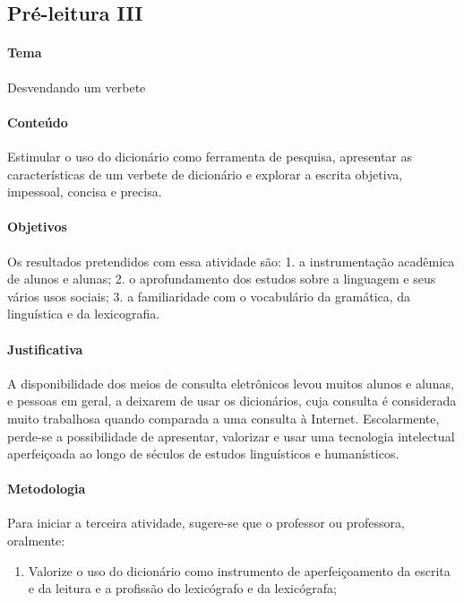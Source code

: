 \documentclass[12pt]{extarticle}
\begin{document}
{\subsection{Pré-leitura III}

\paragraph{Tema} Desvendando um verbete 


\paragraph{Conteúdo} Estimular o uso do dicionário como ferramenta de pesquisa, apresentar as características de um verbete de dicionário e explorar a escrita objetiva, impessoal, concisa e precisa.


\paragraph{Objetivos}
Os resultados pretendidos com essa atividade são: 1. a instrumentação
acadêmica de alunos e alunas; 2. o aprofundamento dos estudos sobre a
linguagem e seus vários usos sociais; 3. a familiaridade com o
vocabulário da gramática, da linguística e da lexicografia.

\paragraph{Justificativa}
A disponibilidade dos meios de consulta eletrônicos levou muitos alunos
e alunas, e pessoas em geral, a deixarem de usar os dicionários, cuja
consulta é considerada muito trabalhosa quando comparada a uma consulta
à Internet. Escolarmente, perde-se a possibilidade de apresentar,
valorizar e usar uma tecnologia intelectual aperfeiçoada ao longo de
séculos de estudos linguísticos e humanísticos.

\paragraph{Metodologia}
Para iniciar a terceira atividade, sugere-se que o professor ou
professora, oralmente:

\begin{enumerate}
\item
Valorize o uso do dicionário como instrumento de aperfeiçoamento da
escrita e da leitura e a profissão do lexicógrafo e da lexicógrafa;


\end{enumerate}}
\end{document}
